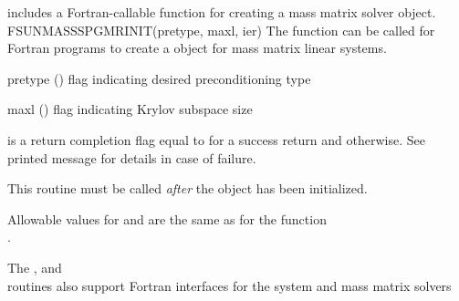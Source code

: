 includes a Fortran-callable function for creating a
 mass matrix solver object.
{
  FSUNMASSSPGMRINIT(pretype, maxl, ier)
}
{
  The function  can be called for Fortran programs
  to create a {\sunlinsolspgmr} object for mass matrix linear systems.
}
{
  \begin{args}[pretype]
  \item[pretype] ()
    flag indicating desired preconditioning type
  \item[maxl] ()
    flag indicating Krylov subspace size
  \end{args}
}
{
   is a  return completion flag equal to  for a success
  return and  otherwise. See printed message for details in case
  of failure.
}
{
  This routine must be called \emph{after} the {\nvector} object has
  been initialized. 

  Allowable values for  and  are the same as for
  the {\CC} function \\ \noindent {}. 
}
The , 
and \\ \noindent {} routines also
support Fortran interfaces for the system and mass matrix solvers

